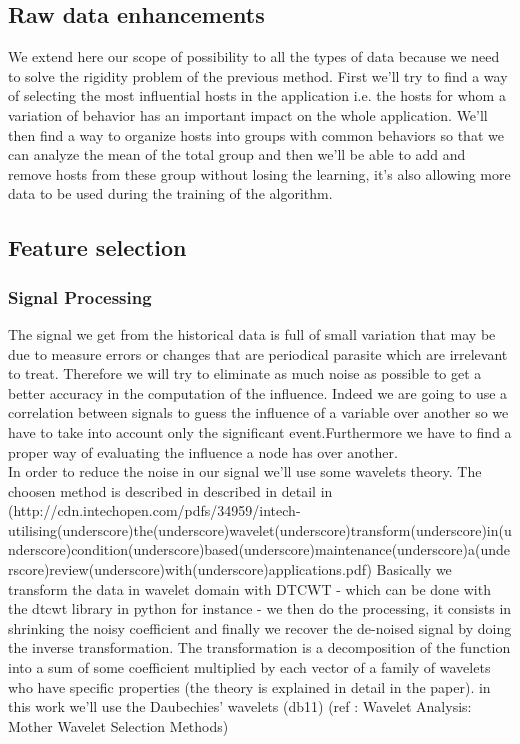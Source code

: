 \documentclass[10pt,a4paper,oneside]{article}
\begin{document}
\begin{multicols}{2}
\section{Raw data enhancements}
We extend here our scope of possibility to all the types of data because we need to solve the rigidity problem of the previous method. First we'll try to find a way of selecting the most influential hosts in the application i.e. the hosts for whom a variation of behavior has an important impact on the whole application. We'll then find a way to organize hosts into groups with common behaviors so that we can analyze the mean of the total group and then we'll be able to add and remove hosts from these group without losing the learning, it's also allowing more data to be used during the training of the algorithm.
\subsection{Feature selection}
\subsubsection{Signal Processing}
The signal we get from the historical data is full of small variation that may be due to measure errors or changes that are periodical parasite which are irrelevant to treat. Therefore we will try to eliminate as much noise as possible to get a better accuracy in the computation of the influence. Indeed we are going to use a correlation between signals to guess the influence of a variable over another so we have to take into account only the significant event.Furthermore we have to find a proper way of evaluating the influence a node has over another.
\\
In order to reduce the noise in our signal we'll use some wavelets theory. The choosen method is described in described in detail in (http://cdn.intechopen.com/pdfs/34959/intech-utilising(underscore)the(underscore)wavelet(underscore)transform(underscore)in(underscore)condition(underscore)based(underscore)maintenance(underscore)a(underscore)review(underscore)with(underscore)applications.pdf)
Basically we transform the data in wavelet domain with DTCWT - which can be done with the dtcwt library in python for instance - we then do the processing, it consists in shrinking the noisy coefficient and finally we recover the de-noised signal by doing the inverse transformation.
The transformation is a decomposition of the function into a sum of some coefficient multiplied by each vector of a family of wavelets who have specific properties (the theory is explained in detail in the paper). in this work we'll use the Daubechies' wavelets (db11) (ref : Wavelet Analysis: Mother Wavelet Selection Methods)

\end{multicols}
\end{document}
